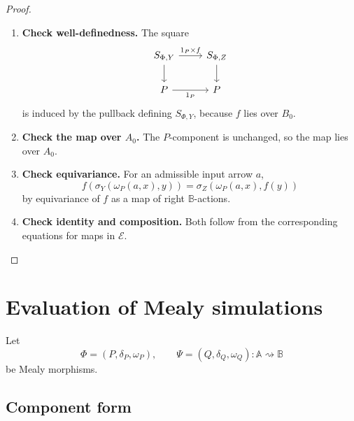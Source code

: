\begin{proof}
\leavevmode
\begin{enumerate}
\item \textbf{Check well-definedness.}
The square
\[
\begin{tikzcd}
S_{\Phi,Y}
\arrow[r,"1_P\times f"]
\arrow[d]
&
S_{\Phi,Z}
\arrow[d]
\\
P
\arrow[r,"1_P"']
&
P
\end{tikzcd}
\]
is induced by the pullback defining \(S_{\Phi,Y}\), because \(f\) lies over
\(B_0\).

\item \textbf{Check the map over \(A_0\).}
The \(P\)-component is unchanged, so the map lies over \(A_0\).

\item \textbf{Check equivariance.}
For an admissible input arrow \(a\),
\[
f(\sigma_Y(\omega_P(a,x),y))
=
\sigma_Z(\omega_P(a,x),f(y))
\]
by equivariance of \(f\) as a map of right \(\mathbb B\)-actions.

\item \textbf{Check identity and composition.}
Both follow from the corresponding equations for maps in \(\mathcal E\).
\end{enumerate}
\end{proof}

\section{Evaluation of Mealy simulations}
\label{sec:relative-evaluation-mealy-simulations}

Let
\[
\Phi=(P,\delta_P,\omega_P),
\qquad
\Psi=(Q,\delta_Q,\omega_Q)
:
\mathbb A\rightsquigarrow\mathbb B
\]
be Mealy morphisms.

\subsection{Component form}
\label{subsec:relative-simulation-component-form}

